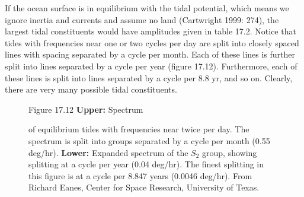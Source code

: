 If the ocean surface is in equilibrium
with the tidal potential, which means we ignore inertia and currents
and assume no land (Cartwright 1999: 274), the largest tidal
constituents would have amplitudes given in table 17.2. Notice that
tides with frequencies near one or two cycles per day are split into
closely spaced lines with spacing separated by a cycle per month. Each
of these lines is further split into lines separated by a cycle per
year (figure 17.12). Furthermore, each of these lines is split into
lines separated by a cycle per 8.8 yr, and so on. Clearly, there are
very many possible tidal constituents.

\begin{figure}[t!]
\footnotesize
Figure 17.12 \textbf{Upper:} Spectrum \rule{0mm}{3ex}of equilibrium
tides with frequencies near twice per
day. The spectrum is split into groups separated by a cycle per month
(0.55 deg/hr). \textbf{Lower:} Expanded spectrum of the $S_2$ group,
showing splitting at a cycle per year (0.04 deg/hr). The finest
splitting in this figure is at a cycle per 8.847 years (0.0046
deg/hr). From Richard Eanes, Center for Space Research, University of
Texas.
\label{combinedtides}
\vspace{-3ex}
\end{figure}

